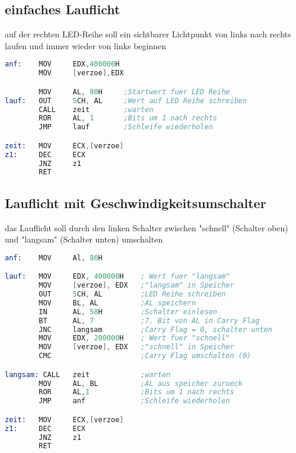 \documentclass[10pt, a4paper]{report}
\begin{document}
\subsection*{einfaches Lauflicht}
auf der rechten LED-Reihe soll ein sichtbarer Lichtpunkt von links nach rechts laufen und immer wieder von links beginnen

\begin{lstlisting}[language=Assembler]
anf:    MOV     EDX,400000H
        MOV     [verzoe],EDX

        MOV     AL, 80H     ;Startwert fuer LED Reihe
lauf:   OUT     5CH, AL     ;Wert auf LED Reihe schreiben
        CALL    zeit        ;warten
        ROR     AL, 1       ;Bits um 1 nach rechts 
        JMP     lauf        ;Schleife wiederholen

zeit:   MOV     ECX,[verzoe]
z1:     DEC     ECX
        JNZ     z1
        RET
\end{lstlisting}



\subsection*{Lauflicht mit Geschwindigkeitsumschalter}
das Lauflicht soll durch den linken Schalter zwischen "schnell" (Schalter oben) und "langsam" (Schalter unten) umschalten

\begin{lstlisting}[language=Assembler]
anf:    MOV     Al, 80H

lauf:   MOV     EDX, 400000H    ; Wert fuer "langsam"
        MOV     [verzoe], EDX   ;"langsam" in Speicher
        OUT     5CH, AL         ;LED Reihe schreiben
        MOV     BL, AL          ;AL speichern
        IN      AL, 58H         ;Schalter einlesen
        BT      AL, 7           ;7. Bit von AL in Carry Flag
        JNC     langsam         ;Carry Flag = 0, schalter unten
        MOV     EDX, 200000H    ; Wert fuer "schnell"
        MOV     [verzoe], EDX   ;"schnell" in Speicher
        CMC                     ;Carry Flag umschalten (0)

langsam: CALL   zeit            ;warten
        MOV     AL, BL          ;AL aus speicher zurueck
        ROR     AL,1            ;Bits um 1 nach rechts
        JMP     anf             ;Schleife wiederholen

zeit:   MOV     ECX,[verzoe]
z1:     DEC     ECX
        JNZ     z1
        RET
\end{lstlisting}

\clearpage
\end{document}
